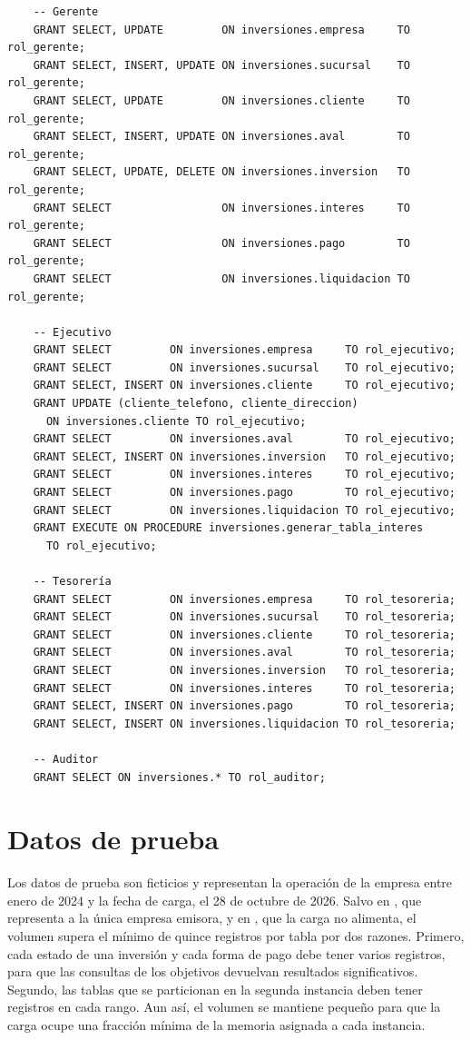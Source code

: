 \begin{verbatim}
	-- Gerente
	GRANT SELECT, UPDATE         ON inversiones.empresa     TO rol_gerente;
	GRANT SELECT, INSERT, UPDATE ON inversiones.sucursal    TO rol_gerente;
	GRANT SELECT, UPDATE         ON inversiones.cliente     TO rol_gerente;
	GRANT SELECT, INSERT, UPDATE ON inversiones.aval        TO rol_gerente;
	GRANT SELECT, UPDATE, DELETE ON inversiones.inversion   TO rol_gerente;
	GRANT SELECT                 ON inversiones.interes     TO rol_gerente;
	GRANT SELECT                 ON inversiones.pago        TO rol_gerente;
	GRANT SELECT                 ON inversiones.liquidacion TO rol_gerente;

	-- Ejecutivo
	GRANT SELECT         ON inversiones.empresa     TO rol_ejecutivo;
	GRANT SELECT         ON inversiones.sucursal    TO rol_ejecutivo;
	GRANT SELECT, INSERT ON inversiones.cliente     TO rol_ejecutivo;
	GRANT UPDATE (cliente_telefono, cliente_direccion)
	  ON inversiones.cliente TO rol_ejecutivo;
	GRANT SELECT         ON inversiones.aval        TO rol_ejecutivo;
	GRANT SELECT, INSERT ON inversiones.inversion   TO rol_ejecutivo;
	GRANT SELECT         ON inversiones.interes     TO rol_ejecutivo;
	GRANT SELECT         ON inversiones.pago        TO rol_ejecutivo;
	GRANT SELECT         ON inversiones.liquidacion TO rol_ejecutivo;
	GRANT EXECUTE ON PROCEDURE inversiones.generar_tabla_interes
	  TO rol_ejecutivo;

	-- Tesorería
	GRANT SELECT         ON inversiones.empresa     TO rol_tesoreria;
	GRANT SELECT         ON inversiones.sucursal    TO rol_tesoreria;
	GRANT SELECT         ON inversiones.cliente     TO rol_tesoreria;
	GRANT SELECT         ON inversiones.aval        TO rol_tesoreria;
	GRANT SELECT         ON inversiones.inversion   TO rol_tesoreria;
	GRANT SELECT         ON inversiones.interes     TO rol_tesoreria;
	GRANT SELECT, INSERT ON inversiones.pago        TO rol_tesoreria;
	GRANT SELECT, INSERT ON inversiones.liquidacion TO rol_tesoreria;

	-- Auditor
	GRANT SELECT ON inversiones.* TO rol_auditor;
\end{verbatim}

\section{Datos de prueba}

Los datos de prueba son ficticios y representan la operación de la empresa entre enero de 2024 y la fecha de carga, el 28 de octubre de 2026. Salvo en , que representa a la única empresa emisora, y en , que la carga no alimenta, el volumen supera el mínimo de quince registros por tabla por dos razones. Primero, cada estado de una inversión y cada forma de pago debe tener varios registros, para que las consultas de los objetivos devuelvan resultados significativos. Segundo, las tablas que se particionan en la segunda instancia deben tener registros en cada rango. Aun así, el volumen se mantiene pequeño para que la carga ocupe una fracción mínima de la memoria asignada a cada instancia.

